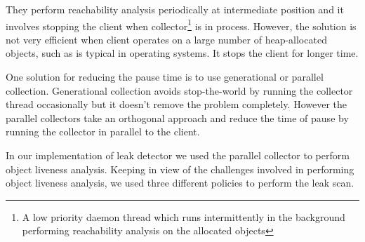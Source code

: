 They perform reachability analysis periodically at intermediate position and it involves stopping the client when collector\footnote{A low priority daemon thread which runs intermittently in the background performing reachability analysis on the allocated objects} is in process. However, the solution is not very efficient when client operates on a large number of heap-allocated objects, such as is typical in operating systems. It stops the client for longer time. 

One solution for reducing the pause time is to use generational or parallel collection. Generational collection avoids stop-the-world by running the collector thread occasionally but it doesn't remove the problem completely. However the parallel collectors take an orthogonal approach and reduce the time of pause by running the collector in parallel to the client.


In our implementation of leak detector we used the parallel collector to perform object liveness analysis. Keeping in view of the challenges involved in performing object liveness analysis, we used three different policies to perform the leak scan. 



